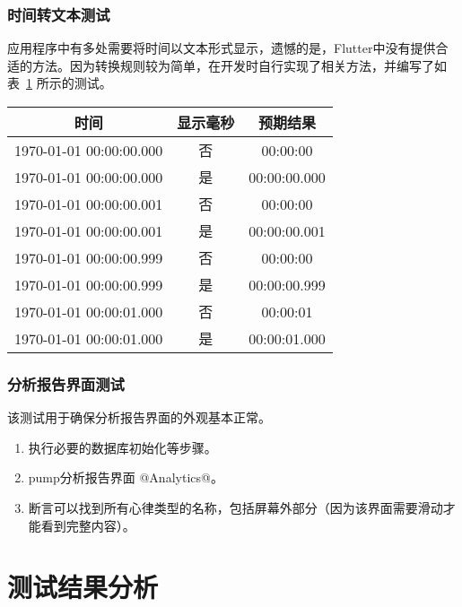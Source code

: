 \subsubsection{时间转文本测试}

应用程序中有多处需要将时间以文本形式显示，遗憾的是，Flutter中没有提供合适的方法。因为转换规则较为简单，在开发时自行实现了相关方法，并编写了如表~\ref{tab:time-to-text} 所示的测试。

\begin{table}[!ht]
    \centering
    \label{tab:time-to-text}
    \begin{tabular}{|c|c|c|}
        \hline
        时间                      & 显示毫秒 & 预期结果         \\
        \hline
        1970-01-01 00:00:00.000 & 否    & 00:00:00     \\
        \hline
        1970-01-01 00:00:00.000 & 是    & 00:00:00.000 \\
        \hline
        1970-01-01 00:00:00.001 & 否    & 00:00:00     \\
        \hline
        1970-01-01 00:00:00.001 & 是    & 00:00:00.001 \\
        \hline
        1970-01-01 00:00:00.999 & 否    & 00:00:00     \\
        \hline
        1970-01-01 00:00:00.999 & 是    & 00:00:00.999 \\
        \hline
        1970-01-01 00:00:01.000 & 否    & 00:00:01     \\
        \hline
        1970-01-01 00:00:01.000 & 是    & 00:00:01.000 \\
        \hline
    \end{tabular}
\end{table}

\subsubsection{分析报告界面测试}

该测试用于确保分析报告界面的外观基本正常。

\begin{enumerate}
    \item 执行必要的数据库初始化等步骤。
    \item pump分析报告界面 @Analytics@。
    \item 断言可以找到所有心律类型的名称，包括屏幕外部分（因为该界面需要滑动才能看到完整内容）。
\end{enumerate}


\section{测试结果分析}\label{sec:test-result}

